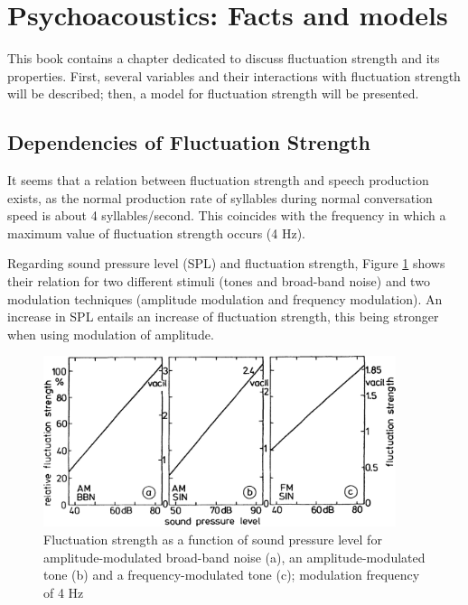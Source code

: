 \section{Psychoacoustics: Facts and models}

This book contains a chapter dedicated to discuss fluctuation strength and its
properties. First, several variables and their interactions with fluctuation
strength will be described; then, a model for fluctuation strength will be
presented.

\subsection{Dependencies of Fluctuation Strength}

It seems that a relation between fluctuation strength and speech production
exists, as the normal production rate of syllables during normal conversation
speed is about 4 syllables/second. This coincides with the frequency in which a
maximum value of fluctuation strength occurs (4 Hz).

Regarding sound pressure level (SPL) and fluctuation strength, Figure
\ref{fig:flucstrenvsndpreslvl} shows their relation for two different stimuli
(tones and broad-band noise) and two modulation techniques (amplitude modulation
and frequency modulation). An increase in SPL entails an increase of fluctuation
strength, this being stronger when using modulation of amplitude.

\begin{figure}
    \centering
    \includegraphics[height=5cm]
        {img/Fastl2007-FluctuationStrengthVsSoundPressureLevel}
    \caption{Fluctuation strength as a function of sound pressure level for
        amplitude-modulated broad-band noise (a), an amplitude-modulated tone
        (b) and a frequency-modulated tone (c); modulation frequency of 4 Hz
        \cite[pp. 249]{Fastl2007Psychoacoustics}}
    \label{fig:flucstrenvsndpreslvl}
\end{figure}

